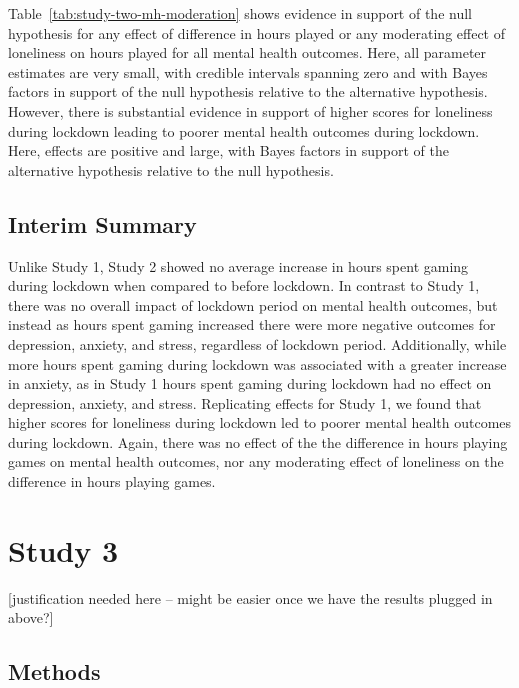 \documentclass[
  english,
  man,floatsintext]{apa6}
\begin{document}
Table~\ref{tab:study-two-mh-moderation} shows evidence in support of the null hypothesis for any effect of difference in hours played or any moderating effect of loneliness on hours played for all mental health outcomes. Here, all parameter estimates are very small, with credible intervals spanning zero and with Bayes factors in support of the null hypothesis relative to the alternative hypothesis. However, there is substantial evidence in support of higher scores for loneliness during lockdown leading to poorer mental health outcomes during lockdown. Here, effects are positive and large, with Bayes factors in support of the alternative hypothesis relative to the null hypothesis.

\hypertarget{interim-summary-1}{%
\subsection{Interim Summary}\label{interim-summary-1}}

Unlike Study 1, Study 2 showed no average increase in hours spent gaming during lockdown when compared to before lockdown. In contrast to Study 1, there was no overall impact of lockdown period on mental health outcomes, but instead as hours spent gaming increased there were more negative outcomes for depression, anxiety, and stress, regardless of lockdown period. Additionally, while more hours spent gaming during lockdown was associated with a greater increase in anxiety, as in Study 1 hours spent gaming during lockdown had no effect on depression, anxiety, and stress. Replicating effects for Study 1, we found that higher scores for loneliness during lockdown led to poorer mental health outcomes during lockdown. Again, there was no effect of the the difference in hours playing games on mental health outcomes, nor any moderating effect of loneliness on the difference in hours playing games.

\hypertarget{study-3}{%
\section{Study 3}\label{study-3}}

{[}justification needed here -- might be easier once we have the results plugged in above?{]}

\hypertarget{methods-2}{%
\subsection{Methods}\label{methods-2}}
\end{document}
